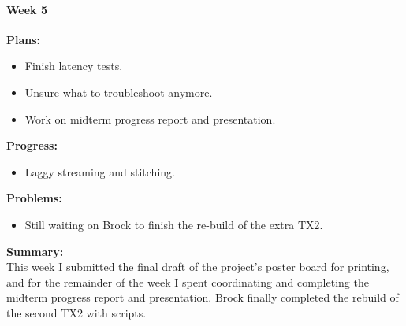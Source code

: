 \paragraph{Week 5}
\begin{adjustwidth}{2.5em}{0pt}
    \vspace{-0.5cm}\textbf{Plans:}
    \vspace{-0.5cm}
    \begin{itemize}
        \item Finish latency tests.
		\item Unsure what to troubleshoot anymore.
		\item Work on midterm progress report and presentation. 
    \end{itemize} 
    \vspace{-0.3cm}\textbf{Progress:}
    \vspace{-0.5cm}
    \begin{itemize}
        \item Laggy streaming and stitching.
    \end{itemize} 
    \vspace{-0.3cm}\textbf{Problems:}
    \vspace{-0.5cm}
    \begin{itemize}
        \item Still waiting on Brock to finish the re-build of the extra TX2. 
    \end{itemize}  
    \vspace{-0.3cm}\noindent\textbf{Summary:}\\
    \noindent This week I submitted the final draft of the project's poster board for printing, and for the remainder of the week I spent coordinating and completing the midterm progress report and presentation. Brock finally completed the rebuild of the second TX2 with scripts.
\end{adjustwidth} 

